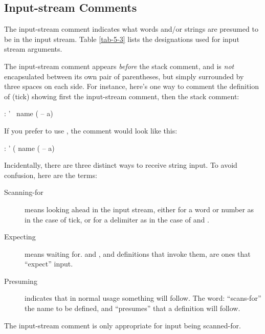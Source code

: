\subsection{Input-stream Comments}%

The input-stream comment indicates what words and/or strings are
presumed to be in the input stream. Table \ref{tab-5-3} lists the
designations used for input stream arguments.

The input-stream comment appears \emph{before} the stack comment, and
is \emph{not} encapsulated between its own pair of parentheses, but
simply surrounded
by three spaces on each side.  For instance, here's one way to comment
the definition of  (tick) showing first the input-stream comment,
then the stack comment:
\begin{Code}
: '   \ name   ( -- a)
\end{Code}
If you prefer to use \forth{(} , the comment would look like this:
\begin{Code}
: '   ( name   ( -- a)
\end{Code}
%
Incidentally, there are three distinct ways to receive string input.
To avoid confusion, here are the terms:

\begin{description}
\item[Scanning-for]%
means looking ahead in the input stream, either for a word or number
as in the case of tick, or for a delimiter as in the case of
 and \forth{(} .
\item[Expecting]%
means waiting for.  and , and definitions
that invoke them, are ones that ``expect'' input.
\item[Presuming]%
indicates that in normal usage something will follow.  The word:
``scans-for'' the name to be defined, and ``presumes'' that a
definition will follow.
\end{description}
The input-stream comment is only appropriate for input being scanned-for.%
%

